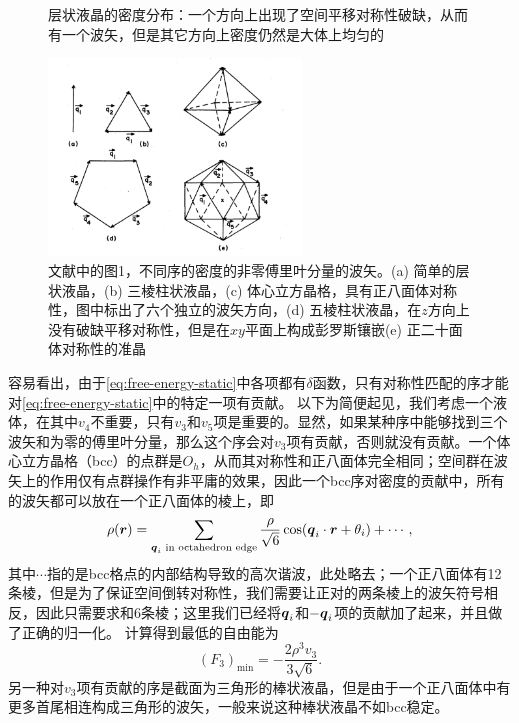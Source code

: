 \documentclass[hyperref, UTF8, a4paper]{ctexart}
\begin{document}
\begin{figure}
    \centering
    
    \caption{层状液晶的密度分布：一个方向上出现了空间平移对称性破缺，从而有一个波矢，但是其它方向上密度仍然是大体上均匀的}
    \label{fig:smectic}
\end{figure}

\begin{figure}
    \centering
    \includegraphics[width=0.6\textwidth]{wavevector.PNG}
    \caption{文献\cite{PhysRevB.32.5764}中的图1，不同序的密度的非零傅里叶分量的波矢。(a) 简单的层状液晶，(b) 三棱柱状液晶，(c) 体心立方晶格，具有正八面体对称性，图中标出了六个独立的波矢方向，(d) 五棱柱状液晶，在$z$方向上没有破缺平移对称性，但是在$xy$平面上构成彭罗斯镶嵌(e) 正二十面体对称性的准晶}
    \label{fig:wavevectors}
\end{figure}

容易看出，由于\eqref{eq:free-energy-static}中各项都有$\delta$函数，只有对称性匹配的序才能对\eqref{eq:free-energy-static}中的特定一项有贡献。
以下为简便起见，我们考虑一个液体，在其中$v_4$不重要，只有$v_3$和$v_5$项是重要的。显然，如果某种序中能够找到三个波矢和为零的傅里叶分量，那么这个序会对$v_3$项有贡献，否则就没有贡献。一个体心立方晶格（bcc）的点群是$O_h$，从而其对称性和正八面体完全相同；空间群在波矢上的作用仅有点群操作有非平庸的效果，因此一个bcc序对密度的贡献中，所有的波矢都可以放在一个正八面体的棱上，即
\begin{equation}
    \rho(\vb*{r}) = \sum_\text{$\vb*{q}_i$ in octahedron edge} \frac{\rho}{\sqrt{6}} \cos(\vb*{q}_i \cdot \vb*{r} + \theta_i) + \cdots,
\end{equation}
其中$\cdots$指的是bcc格点的内部结构导致的高次谐波，此处略去；一个正八面体有12条棱，但是为了保证空间倒转对称性，我们需要让正对的两条棱上的波矢符号相反，因此只需要求和6条棱；这里我们已经将$\vb*{q}_i$和$-\vb*{q}_i$项的贡献加了起来，并且做了正确的归一化。
计算得到最低的自由能为
\begin{equation}
    (F_3)_\text{min} = - \frac{2 \rho^3 v_3}{3 \sqrt{6}}.
    \label{eq:bcc-free-energy}
\end{equation}
另一种对$v_3$项有贡献的序是截面为三角形的棒状液晶，但是由于一个正八面体中有更多首尾相连构成三角形的波矢，一般来说这种棒状液晶不如bcc稳定。
\end{document}
